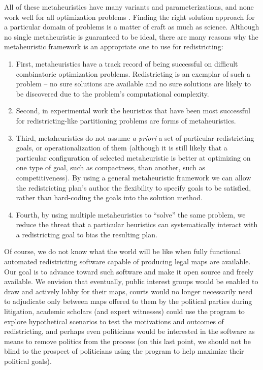 \documentclass[article]{JSSstyle/jss}
\begin{document}
All of these metaheuristics have many variants and parameterizations, and none work well for all optimization problems \citep[][]{WolMac97}.  
Finding the right solution approach for a particular domain of problems is a matter of craft as much as science. Although no single metaheuristic is guaranteed to be ideal, there are many reasons 
why the metaheuristic framework is an appropriate one to use for redistricting:
\begin{enumerate}
\item First, metaheuristics have a track record of being successful on difficult combinatoric 
optimization problems. Redistricting is an exemplar of such a problem -- no sure solutions 
are available and no sure solutions are likely to be discovered due to the problem's computational complexity.
\item Second, in experimental work the heuristics that have been most successful 
for redistricting-like partitioning problems are forms of metaheuristics.
\item Third, metaheuristics do not assume \emph{a-priori} a set of 
particular redistricting goals, or operationalization of them (although 
it is still likely that a particular configuration of selected metaheuristic is better at optimizing on one
type of goal, such as compactness, than another, such as competitiveness). 
By using a general metaheuristic framework we can allow the redistricting plan's author 
the flexibility to specify goals to be satisfied, rather than hard-coding the
goals into the solution method.
\item Fourth, by using multiple metaheuristics to ``solve'' the same problem, 
we reduce the threat that a particular heuristics can systematically interact 
with a redistricting goal \citep[see][]{Altman98} to bias the resulting plan.
\end{enumerate}

Of course, we do not know what the world will be like when fully functional 
automated redistricting software capable of producing legal maps are available.  
Our goal is to advance toward such software and make it open source and freely available.  We envision that eventually, public interest groups would be enabled to draw and actively lobby for their maps, 
courts would no longer necessarily need to adjudicate only between 
maps offered to them by the political parties during litigation, 
academic scholars (and expert witnesses) could use the program to 
explore hypothetical scenarios to test the motivations and outcomes 
of redistricting, and perhaps even politicians would 
be interested in the software as means to remove politics from the 
process (on this last point, we should not be blind to the prospect 
of politicians using the program to help maximize their political goals).
\end{document}
